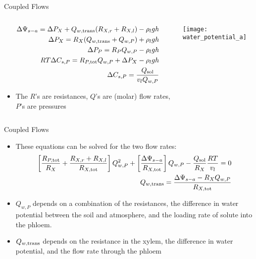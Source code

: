 \documentclass[10pt]{beamer}
\newcommand{\tn}{\textnormal}
\begin{document}
\begin{frame}{Coupled Flows}
  \begin{columns}
    \begin{column}{.49\textwidth}
      \begin{align*}
        \Delta \Psi_{s-a} = \Delta P_X + Q_{w, \tn{trans}} (R_{X, r} +
        R_{X, l}) - \rho_l g h \\
        \Delta P_X = R_X (Q_{w, \tn{trans}} + Q_{w, P}) + \rho_l g h
        \\
        \Delta P_P = R_P Q_{w, P} - \rho_l g h\\
        RT \Delta C_{s, P} = R_{P, \tn{tot}} Q_{w, P} + \Delta P_X -
        \rho_l g h \\
        \Delta C_{s, P} = \frac{Q_\tn{sol}}{v_l Q_{w, P}}
      \end{align*}
      \begin{itemize}
      \item The $R$'s are resistances, $Q$'s are (molar) flow rates,
        $P$'s are pressures
      \end{itemize}
    \end{column}
    \begin{column}{.49\textwidth}
      \vfill
      \begin{center}
        \texttt{[image: water\_potential\_a]}
      \end{center}
      \vfill
    \end{column}
  \end{columns}
\end{frame}

\begin{frame}{Coupled Flows}
  \begin{itemize}
  \item These equations can be solved for the two flow rates:
    \begin{align*}
      \left[\frac{R_{P, \tn{tot}}}{R_X} + \frac{R_{X, r} + R_{X,
      l}}{R_{X, \tn{tot}}}\right] Q_{w, P}^2 + \left[\frac{\Delta
      \Psi_{s-a}}{R_{X, \tn{tot}}}\right] Q_{w, P} -
      \frac{Q_\tn{sol}}{R_X} \frac{RT}{v_l} = 0 \\
      Q_{w, \tn{trans}} = \frac{\Delta \Psi_{s-a} - R_X Q_{w,
      P}}{R_{X, \tn{tot}}}
    \end{align*}
  \item $Q_{w,P}$ depends on a combination of the resistances, the
    difference in water potential between the soil and atmosphere, and
    the loading rate of solute into the phloem.
  \item $Q_{w, \tn{trans}}$ depends on the resistance in the xylem,
    the difference in water potential, and the flow rate through the
    phloem
  \end{itemize}
\end{frame}
\end{document}
